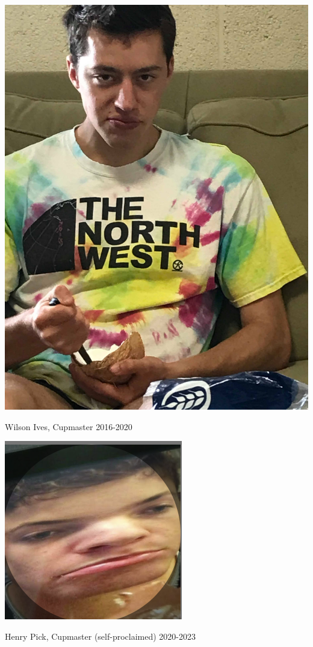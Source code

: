 \documentclass[12pt]{IEEEconf}
\begin{document}
\begin{center}
    \includegraphics*[width=0.7\linewidth]{fig/wilson.jpg}

    Wilson Ives, Cupmaster 2016-2020

    \includegraphics*[width=0.7\linewidth]{fig/henry.png}

    Henry Pick, Cupmaster (self-proclaimed) 2020-2023


\end{center}
\end{document}

